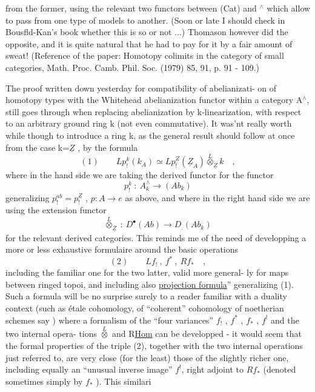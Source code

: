 
from the former,  using the relevant two functors between (Cat) and \hand{$\Delta$}$^{\wedge}$
which allow to pass from one type of models to another. (Soon or late
I should check in Bousfld-Kan's book whether this is so or not ...)
Thomason however did the opposite,  and it is quite natural that he had
to pay for it by a fair amount of sweat!   (Reference of the paper:
Homotopy colimits in the category of small categories,  Math. Proc.
Camb. Phil. Soc. (1979)\unsure{;} 85, 91,  p. 91 - 109.)

The proof written down yesterday for compatibility of abelianizati-%
on of homotopy types with the Whitehead abelianization functor within
a category A$^{\wedge}$,  still goes through when replacing abelianization by
k-linearization,  with respect to an arbitrary ground ring k (not even
commutative).  It was'nt really worth while though to introduce a ring
k,  as the general result should follow at once from the case k=$\underline{Z}$ ,
by the formula
\[ (1) \qquad Lp^{k}_{!}(k_{A}) \simeq Lp^{\underline{Z}}_{!}(\underline{Z}_{A}) \overset{L}{\otimes}_{\underline{Z}} k \quad , \]
where in the  hand side we are taking the  derived functor for the
functor
\[ p^{k}_{!} \ : \ A^{\wedge}_{k} \longrightarrow (Ab_{k}) \]
generalizing $p^{ab}_{!} = p^{\underline{Z}}_{!}$ , \hand{(} $p\colon A \to e$  as above\hand{)}, and where in
the  right hand side we are using the  extension
functor
\[ \overset{L}{\otimes}_{\underline{Z}} \ : \ D^{\bullet}(Ab) \longrightarrow D_{.}(Ab_{k}) \]
for the relevant derived categories.  This reminds me of the need of
developping  a more or less exhaustive formulaire around the
basic operations
\[ (2) \qquad Lf_{!} \ , \ f^{*} \ , \ Rf_{*} \quad , \]
including the familiar one for  the two latter,  valid  more general-%
ly for maps between ringed topoi,  and including also  \uline{projection
formula}'' generalizing (1).  Such a formula will be no surprise surely
to a reader familiar with a duality context (such as étale cohomology,
of ``coherent'' cohomology of noetherian schemes say )\hand{,} where a formalism
of the ``four variances''  $f_{!}$ , $f^{*}$ , $f_{*}$ , $f^{!}$  and the two internal opera-%
tions $\overset{L}{\otimes}$  and R\uline{Hom}  can be developped -  it would seem that the formal
properties of the triple (2),  together with the two internal operations
just referred to,  are very close (for the least)  those of the
slightly richer one, including equally an ``unusual inverse image'' $f^{!}$,
 right adjoint to \uline{$Rf_{*}$}  (denoted sometimes simply by $f_{*}$ ).  This similari

